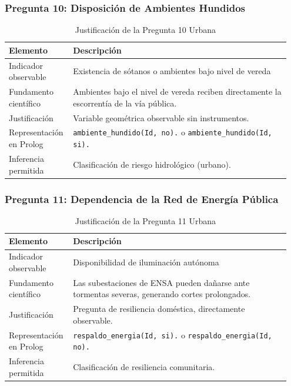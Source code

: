\documentclass[12pt, letterpaper]{article}
\begin{document}
\subsubsection*{Pregunta 10: Disposición de Ambientes Hundidos}
\begin{table}[H]
\centering
\caption{Justificación de la Pregunta 10 Urbana}
\label{tab:p10u}
\begin{tabular}{@{}p{0.2\linewidth}p{0.75\linewidth}@{}}
\toprule
\textbf{Elemento} & \textbf{Descripción} \\ \midrule
Indicador observable & Existencia de sótanos o ambientes bajo nivel de vereda \\
Fundamento científico & Ambientes bajo el nivel de vereda reciben directamente la escorrentía de la vía pública. \\
Justificación & Variable geométrica observable sin instrumentos. \\
Representación en Prolog & \texttt{ambiente\_hundido(Id, no).} o \texttt{ambiente\_hundido(Id, si).} \\
Inferencia permitida & Clasificación de riesgo hidrológico (urbano). \\ \bottomrule
\end{tabular}
\end{table}

\subsubsection*{Pregunta 11: Dependencia de la Red de Energía Pública}
\begin{table}[H]
\centering
\caption{Justificación de la Pregunta 11 Urbana}
\label{tab:p11u}
\begin{tabular}{@{}p{0.2\linewidth}p{0.75\linewidth}@{}}
\toprule
\textbf{Elemento} & \textbf{Descripción} \\ \midrule
Indicador observable & Disponibilidad de iluminación autónoma \\
Fundamento científico & Las subestaciones de ENSA pueden dañarse ante tormentas severas, generando cortes prolongados. \\
Justificación & Pregunta de resiliencia doméstica, directamente observable. \\
Representación en Prolog & \texttt{respaldo\_energia(Id, si).} o \texttt{respaldo\_energia(Id, no).} \\
Inferencia permitida & Clasificación de resiliencia comunitaria. \\ \bottomrule
\end{tabular}
\end{table}
\end{document}

